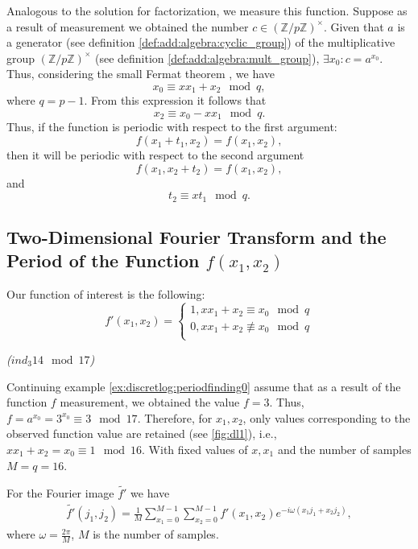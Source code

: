 Analogous to the solution for factorization, we measure this function. Suppose as a result of measurement we obtained the number $c \in \left(\mathbb{Z}/p\mathbb{Z}\right)^\times$. Given that $a$ is a generator (see definition \ref{def:add:algebra:cyclic_group}) of the multiplicative group $\left(\mathbb{Z}/p\mathbb{Z}\right)^\times$ (see definition \ref{def:add:algebra:mult_group}), $\exists x_0: c = a^{x_0}$. Thus, considering the small Fermat theorem , we have
\[
x_0 \equiv x x_1 + x_2 \mod q,
\] 
where $q = p - 1$.
From this expression it follows that
\[
x_2 \equiv x_0 - x x_1 \mod q.
\]
Thus, if the function is periodic with respect to the first argument:
\[
f(x_1 + t_1, x_2) = f(x_1,x_2),
\]
then it will be periodic with respect to the second argument
\[
f(x_1, x_2 + t_2) = f(x_1,x_2),
\]
and 
\begin{equation}
t_2 \equiv x t_1 \mod q.
\label{eq:discretlogeq}
\end{equation}

\subsection{Two-Dimensional Fourier Transform and the Period of the Function $f(x_1, x_2)$}

Our function of interest is the following:
\begin{equation}
\label{eq:shordiscretlog:fprime}
f'\left(x_1, x_2\right) = 
\begin{cases}
1, x x_1 + x_2 \equiv x_0 \mod q \\
0, x x_1 + x_2 \not\equiv x_0 \mod q \\
\end{cases}
\end{equation}
\begin{example}
\emph{($ind_3{14} \mod{17}$)}

Continuing example \ref{ex:discretlog:periodfinding0} assume that as a result of the function $f$ measurement, we obtained the value $f = 3$. Thus, $f = a^{x_0} = 3^{x_0} \equiv 3 \mod 17$. Therefore, for $x_1, x_2$, only values corresponding to the observed function value are retained (see \autoref{fig:dl1}), i.e., $x x_1 + x_2 = x_0 \equiv 1 \mod 16$. With fixed values of $x, x_1$ and the number of samples $M = q = 16$. 
\label{ex:discretlog:periodfinding1}
\end{example}

For the Fourier image $\tilde{f'}$ we have 
\begin{eqnarray}
\tilde{f'}\left(j_1, j_2\right) = 
\frac{1}{M}\sum_{x_1 = 0}^{M-1}\sum_{x_2 = 0}^{M-1} 
f'\left(x_1, x_2\right)e^{-i \omega\left(x_1 j_1 + x_2j_2\right)},
\label{eq:discretlog:ftq16_pre}
\end{eqnarray}
where $\omega = \frac{2 \pi}{M}$, $M$ is the number of samples. 

